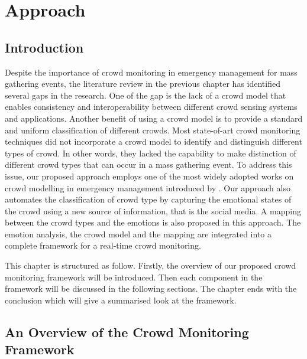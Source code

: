 \chapter{Approach}
\label{ch:approach}
\ifpdf
\graphicspath{{Chapter3/Figs/Raster/}{Chapter3/Figs/PDF/}{Chapter3/Figs/}}
\else
\graphicspath{{Chapter3/Figs/Vector/}{Chapter3/Figs/}}
\fi

\section{Introduction}
\label{sec:approachIntro}
Despite the importance of crowd monitoring in emergency management for mass gathering events, the literature review in the previous chapter has identified several gaps in the research. One of the gap is the lack of a crowd model that enables consistency and interoperability between different crowd sensing systems and applications. Another benefit of using a crowd model is to provide a standard and uniform classification of different crowds. Most state-of-art crowd monitoring techniques did not incorporate a crowd model to identify and distinguish different types of crowd. In other words, they lacked the capability to make distinction of different crowd types that can occur in a mass gathering event. To address this issue, our proposed approach employs one of the most widely adopted works on crowd modelling in emergency management introduced by \citet{Berlonghi1995}. Our approach also automates the classification of crowd type by capturing the emotional states of the crowd using a new source of information, that is the social media. A mapping between the crowd types and the emotions is also proposed in this approach. The emotion analysis, the crowd model and the mapping are integrated into a complete framework for a real-time crowd monitoring.

This chapter is structured as follow. Firstly, the overview of our proposed crowd monitoring framework will be introduced. Then each component in the framework will be discussed in the following sections. The chapter ends with the conclusion which will give a summarised look at the framework.

\section{An Overview of the Crowd Monitoring Framework}

